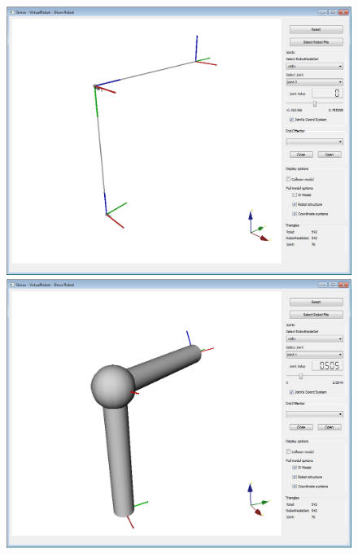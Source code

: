 \documentclass{book}
\begin{document}
\begin{figure}[H]
	\centering
	\begin{minipage} {.45\linewidth}
	  \includegraphics[width=\linewidth]{Tutorial5a}
	\end{minipage}
	\begin{minipage} {.45\linewidth}
	  \includegraphics[width=\linewidth]{Tutorial5b}
	\end{minipage}
\end{figure}
\par
\end{document}
